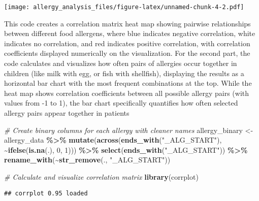\documentclass[
]{article}
\newenvironment{Shaded}{\begin{snugshade}}{\end{snugshade}}
\newcommand{\CommentTok}[1]{\textcolor[rgb]{0.56,0.35,0.01}{\textit{#1}}}
\newcommand{\DecValTok}[1]{\textcolor[rgb]{0.00,0.00,0.81}{#1}}
\newcommand{\FunctionTok}[1]{\textcolor[rgb]{0.13,0.29,0.53}{\textbf{#1}}}
\newcommand{\NormalTok}[1]{#1}
\newcommand{\OtherTok}[1]{\textcolor[rgb]{0.56,0.35,0.01}{#1}}
\newcommand{\SpecialCharTok}[1]{\textcolor[rgb]{0.81,0.36,0.00}{\textbf{#1}}}
\newcommand{\StringTok}[1]{\textcolor[rgb]{0.31,0.60,0.02}{#1}}
\begin{document}
\texttt{[image: allergy\_analysis\_files/figure-latex/unnamed-chunk-4-2.pdf]}

This code creates a correlation matrix heat map showing pairwise
relationships between different food allergens, where blue indicates
negative correlation, white indicates no correlation, and red indicates
positive correlation, with correlation coefficients displayed
numerically on the visualization. For the second part, the code
calculates and visualizes how often pairs of allergies occur together in
children (like milk with egg, or fish with shellfish), displaying the
results as a horizontal bar chart with the most frequent combinations at
the top. While the heat map shows correlation coefficients between all
possible allergy pairs (with values from -1 to 1), the bar chart
specifically quantifies how often selected allergy pairs appear together
in patients

\begin{Shaded}
\begin{Highlighting}[]
\CommentTok{\# Create binary columns for each allergy with cleaner names}
\NormalTok{allergy\_binary }\OtherTok{\textless{}{-}}\NormalTok{ allergy\_data }\SpecialCharTok{\%\textgreater{}\%}
  \FunctionTok{mutate}\NormalTok{(}\FunctionTok{across}\NormalTok{(}\FunctionTok{ends\_with}\NormalTok{(}\StringTok{"\_ALG\_START"}\NormalTok{),}
         \SpecialCharTok{\textasciitilde{}}\FunctionTok{ifelse}\NormalTok{(}\FunctionTok{is.na}\NormalTok{(.), }\DecValTok{0}\NormalTok{, }\DecValTok{1}\NormalTok{))) }\SpecialCharTok{\%\textgreater{}\%}
  \FunctionTok{select}\NormalTok{(}\FunctionTok{ends\_with}\NormalTok{(}\StringTok{"\_ALG\_START"}\NormalTok{)) }\SpecialCharTok{\%\textgreater{}\%}
  \FunctionTok{rename\_with}\NormalTok{(}\SpecialCharTok{\textasciitilde{}}\FunctionTok{str\_remove}\NormalTok{(., }\StringTok{"\_ALG\_START"}\NormalTok{))}

\CommentTok{\# Calculate and visualize correlation matrix}
\FunctionTok{library}\NormalTok{(corrplot)}
\end{Highlighting}
\end{Shaded}

\begin{verbatim}
## corrplot 0.95 loaded
\end{verbatim}
\end{document}
